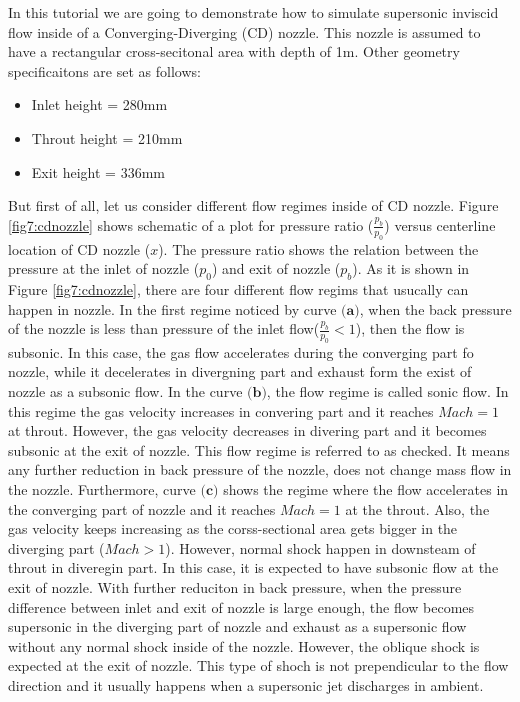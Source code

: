 In this tutorial we are going to demonstrate how to simulate supersonic inviscid flow inside of a Converging-Diverging (CD) nozzle. This nozzle is assumed to have a rectangular cross-secitonal area with depth of 1m. Other geometry specificaitons are set as follows: 
\begin{itemize}
	\item Inlet height = 280mm
	\item Throut height = 210mm 
	\item Exit height = 336mm
\end{itemize}
But first of all, let us consider different flow regimes inside of CD nozzle. Figure \ref{fig7:cdnozzle} shows schematic of a plot for pressure ratio ($\frac{p_{b}}{p_{0}}$) versus centerline location of CD nozzle ($x$). The pressure ratio shows the relation between the pressure at the inlet of nozzle ($p_{0}$) and exit of nozzle ($p_{b}$). As it is shown in Figure \ref{fig7:cdnozzle}, there are four different flow regims that usucally can happen in nozzle. In the first regime noticed by curve $\textbf{(a)}$, when the back pressure of the nozzle is less than pressure of the inlet flow($\frac{p_{b}}{p_{0}}<1$), then the flow is subsonic. In this case, the gas flow accelerates during the converging part fo nozzle, while it decelerates in divergning part and exhaust form the exist of nozzle as a subsonic flow. In the curve $\textbf{(b)}$, the flow regime is called sonic flow. In this regime the gas velocity increases in convering part and it reaches $Mach=1$ at throut. However, the gas velocity decreases in divering part and it becomes subsonic at the exit of nozzle. This flow regime is referred to as checked. It means any further reduction in back pressure of the nozzle, does not change mass flow in the nozzle. Furthermore, curve $\textbf{(c)}$ shows the regime where the flow accelerates in the converging part of nozzle and it reaches $Mach=1$ at the throut. Also, the gas velocity keeps increasing as the corss-sectional area gets bigger in the diverging part ($Mach >1$). However, normal shock happen in downsteam of throut in diveregin part. In this case, it is expected to have subsonic flow at the exit of nozzle.
With further reduciton in back pressure, when the pressure difference between inlet and exit of nozzle is large enough, the flow becomes supersonic in the diverging part of nozzle and exhaust as a supersonic flow without any normal shock inside of the nozzle. However, the oblique shock is expected at the exit of nozzle. This type of shoch is not prependicular to the flow direction and it usually happens when a supersonic jet discharges in ambient.
